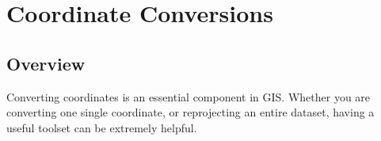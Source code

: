 %
%


\chapter*{Coordinate Conversions}


\section*{Overview}

Converting coordinates is an essential component in GIS.  Whether you are converting one single
coordinate, or reprojecting an entire dataset, having a useful toolset can be extremely helpful. 




